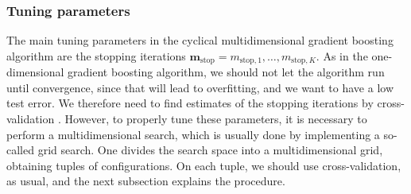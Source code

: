 \subsubsection{Tuning parameters}
The main tuning parameters in the cyclical multidimensional gradient boosting algorithm are the stopping iterations $\boldsymbol{m}_{\text{stop}}=m_{\text{stop},1},\ldots,m_{\text{stop},K}$.
As in the one-dimensional gradient boosting algorithm, we should not let the algorithm run until convergence, since that will lead to overfitting, and we want to have a low test error.
We therefore need to find estimates of the stopping iterations by cross-validation \citep{schmid}.
However, to properly tune these parameters, it is necessary to perform a multidimensional search, which is usually done by implementing a so-called grid search.
One divides the search space into a multidimensional grid, obtaining tuples of configurations.
On each tuple, we should use cross-validation, as usual, and the next subsection explains the procedure.

